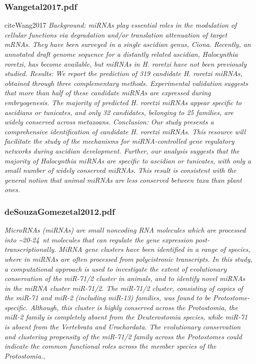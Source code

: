 \documentclass[graybox]{svmult}
\begin{document}
\subsubsection{Wangetal2017.pdf}
cite{Wang2017}
\textit{Background: miRNAs play essential roles in the modulation of cellular functions via degradation and/or translation
attenuation of target mRNAs. They have been surveyed in a single ascidian genus, Ciona. Recently, an annotated
draft genome sequence for a distantly related ascidian, Halocynthia roretzi, has become available, but miRNAs in
H. roretzi have not been previously studied.
Results: We report the prediction of 319 candidate H. roretzi miRNAs, obtained through three complementary
methods. Experimental validation suggests that more than half of these candidate miRNAs are expressed during
embryogenesis. The majority of predicted H. roretzi miRNAs appear specific to 
ascidians or tunicates, and only 32
candidates, belonging to 25 families, are widely conserved across metazoans.
Conclusion: Our study presents a comprehensive identification of candidate H. roretzi miRNAs. This resource
will facilitate the study of the mechanisms for miRNA-controlled gene regulatory networks during ascidian
development. Further, our analysis suggests that the majority of Halocynthia miRNAs are specific to ascidian
or tunicates, with only a small number of widely conserved miRNAs. This result is consistent with the general
notion that animal miRNAs are less conserved between taxa than plant ones.}

\subsubsection{deSouzaGomezetal2012.pdf}
\cite{DeSouzaGomes2013}
\textit{MicroRNAs (miRNAs) are small noncoding RNA molecules which are processed into {\~{}}20-24 nt molecules that can regulate the gene expression post-transcriptionally. MiRNA gene clusters have been identified in a range of species, where in miRNAs are often processed from polycistronic transcripts. In this study, a computational approach is used to investigate the extent of evolutionary conservation of the miR-71/2 cluster in animals, and to identify novel miRNAs in the miRNA cluster miR-71/2. The miR-71/2 cluster, consisting of copies of the miR-71 and miR-2 (including miR-13) families, was found to be Protostome-specific. Although, this cluster is highly conserved across the Protostomia, the miR-2 family is completely absent from the Deuterostomia species, while miR-71 is absent from the Vertebrata and Urochordata. The evolutionary conservation and clustering propensity of the miR-71/2 family across the Protostomes could indicate the common functional roles across the member species of the Protostomia.},
\end{document}
